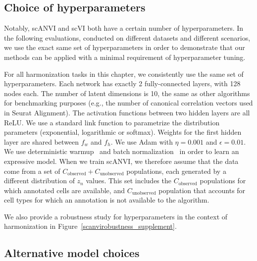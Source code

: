\subsection{Choice of hyperparameters}

Notably, scANVI and scVI both have a certain number of hyperparameters. In the following evaluations, conducted on different datasets and different scenarios, we use the exact same set of hyperparameters in order to demonstrate that our methods can be applied with a minimal requirement of hyperparameter tuning. 

For all harmonization tasks in this chapter, we consistently use the same set of hyperparameters. Each network has exactly 2 fully-connected layers, with 128 nodes each. The number of latent dimensions is 10, the same as other algorithms for benchmarking purposes (e.g., the number of canonical correlation vectors used in Seurat Alignment). The activation functions between two hidden layers are all ReLU. We use a standard link function to parametrize the distribution parameters (exponential, logarithmic or softmax). Weights for the first hidden layer are shared between $f_w$ and $f_h$. We use Adam with $\eta = 0.001$ and $\epsilon = 0.01$. We use deterministic warmup~\cite{warmup} and batch normalization~\cite{batchnorm} in order to learn an expressive model. When we train scANVI, we therefore assume that the data come from a set of $C_\text{observed}+C_\text{unobserved}$ populations, each generated by a different distribution of $z_n$ values. This set includes the $C_\text{observed}$ populations for which annotated cells are available, and $C_\text{unobserved}$ population that accounts for cell types for which an annotation is not available to the algorithm. 

We also provide a robustness study for hyperparameters in the context of harmonization in Figure~\ref{scanvirobustness_supplement}. 

\subsection{Alternative model choices}

